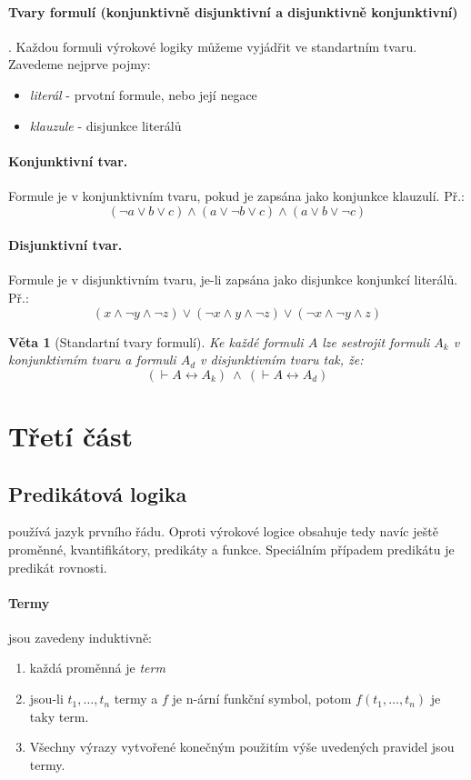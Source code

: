 \documentclass[a4paper]{article}      %
\newtheorem{theorem}{Věta}[section]
\begin{document}
\paragraph{Tvary formulí (konjunktivně disjunktivní a disjunktivně konjunktivní)}. Každou formuli výrokové logiky můžeme vyjádřit ve standartním tvaru. Zavedeme nejprve pojmy:
\begin{itemize}
\item \emph{literál} - prvotní formule, nebo její negace
\item \emph{klauzule} - disjunkce literálů
\end{itemize}

\paragraph{Konjunktivní tvar.} Formule je v konjunktivním tvaru, pokud je zapsána jako konjunkce klauzulí. Př.:
\[
(\neg a\vee b\vee c)\wedge(a\vee \neg b\vee c)\wedge(a\vee b\vee \neg c)
\]

\paragraph{Disjunktivní tvar.} Formule je v disjunktivním tvaru, je-li zapsána jako disjunkce konjunkcí literálů. Př.:
\[
(x\wedge \neg y\wedge \neg z)\vee(\neg x\wedge y\wedge \neg z)\vee(\neg x\wedge \neg y\wedge z)
\]

\begin{theorem}[Standartní tvary formulí]
Ke každé formuli $A$ lze sestrojit formuli $A_{k}$ v konjunktivním tvaru a formuli $A_{d}$ v disjunktivním tvaru tak, že:
\[
(\vdash A \leftrightarrow A_{k})\ \wedge\ (\vdash A \leftrightarrow A_{d})
\]
\end{theorem}

\section{Třetí část}

\subsection{Predikátová logika} používá jazyk prvního řádu.
Oproti výrokové logice obsahuje tedy navíc ještě proměnné, kvantifikátory, predikáty a funkce.
Speciálním případem predikátu je predikát rovnosti.

\paragraph{Termy} jsou zavedeny induktivně:
\begin{enumerate}
\item každá proměnná je \emph{term} 
\item jsou-li $t_1,\ldots,t_{n}$ termy a  $f$ je n-ární funkční symbol, potom $f(t_1,\ldots,t_{n})$ je taky term.
\item Všechny výrazy vytvořené konečným použitím výše uvedených pravidel jsou termy.
\end{enumerate}
\end{document}
